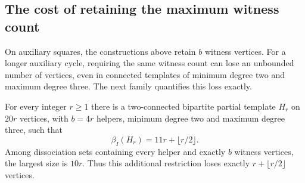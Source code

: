 \subsection{The cost of retaining the maximum witness count}

On auxiliary squares, the constructions above retain $b$ witness vertices.
For a longer auxiliary cycle, requiring the same witness count can lose an
unbounded number of vertices, even in connected templates of minimum degree
two and maximum degree three. The next family quantifies this loss exactly.

\begin{theorem}\label{thm:maximum-witness-loss}
For every integer $r\ge1$ there is a two-connected bipartite partial template
$H_r$ on $20r$ vertices, with $b=4r$ helpers, minimum degree two and maximum
degree three, such that
\[
 \beta_I(H_r)=11r+\lfloor r/2\rfloor.
\]
Among dissociation sets containing every helper and exactly $b$ witness
vertices, the largest size is $10r$. Thus this additional restriction loses
exactly $r+\lfloor r/2\rfloor$ vertices.
\end{theorem}

